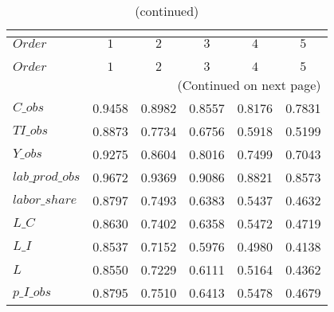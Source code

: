  
\begin{center}
\begin{longtable}{lccccc} 
\caption{COEFFICIENTS OF AUTOCORRELATION}\\
 \label{Table:th_autocorr_matrix}\\
\toprule 
$Order           $	 & 	 $         1$	 & 	 $         2$	 & 	 $         3$	 & 	 $         4$	 & 	 $         5$\\
\midrule \endfirsthead 
\caption{(continued)}\\
 \toprule \\ 
$Order           $	 & 	 $         1$	 & 	 $         2$	 & 	 $         3$	 & 	 $         4$	 & 	 $         5$\\
\midrule \endhead 
\midrule \multicolumn{6}{r}{(Continued on next page)} \\ \bottomrule \endfoot 
\bottomrule \endlastfoot 
$C\_obs          $	 & 	    0.9458	 & 	    0.8982	 & 	    0.8557	 & 	    0.8176	 & 	    0.7831 \\ 
$TI\_obs         $	 & 	    0.8873	 & 	    0.7734	 & 	    0.6756	 & 	    0.5918	 & 	    0.5199 \\ 
$Y\_obs          $	 & 	    0.9275	 & 	    0.8604	 & 	    0.8016	 & 	    0.7499	 & 	    0.7043 \\ 
$lab\_prod\_obs  $	 & 	    0.9672	 & 	    0.9369	 & 	    0.9086	 & 	    0.8821	 & 	    0.8573 \\ 
$labor\_share    $	 & 	    0.8797	 & 	    0.7493	 & 	    0.6383	 & 	    0.5437	 & 	    0.4632 \\ 
$L\_C            $	 & 	    0.8630	 & 	    0.7402	 & 	    0.6358	 & 	    0.5472	 & 	    0.4719 \\ 
$L\_I            $	 & 	    0.8537	 & 	    0.7152	 & 	    0.5976	 & 	    0.4980	 & 	    0.4138 \\ 
$L               $	 & 	    0.8550	 & 	    0.7229	 & 	    0.6111	 & 	    0.5164	 & 	    0.4362 \\ 
$p\_I\_obs       $	 & 	    0.8795	 & 	    0.7510	 & 	    0.6413	 & 	    0.5478	 & 	    0.4679 \\ 
\end{longtable}
 \end{center}
